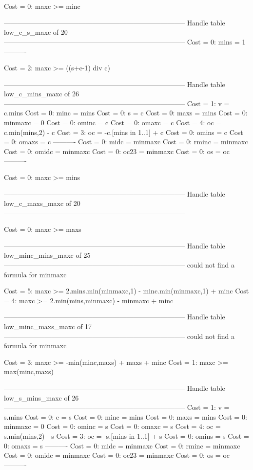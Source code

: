 Cost =  0:  maxc >= minc

--------------------------------------------------------------------------------
Handle table low_c_s_maxc of 20
--------------------------------------------------------------------------------
Cost =  0:  mins = 1
----------

Cost =  2:  maxc >= ((s+c-1) div c)

--------------------------------------------------------------------------------
Handle table low_c_mins_maxc of 26
--------------------------------------------------------------------------------
Cost =  1:  v       = c.mins
Cost =  0:  minc    = mins
Cost =  0:  s       = c
Cost =  0:  maxs    = mins
Cost =  0:  minmaxc = 0
Cost =  0:  ominc   = c
Cost =  0:  omaxc   = c
Cost =  4:  oc      = c.min(mins,2) - c
Cost =  3:  oc      = -c.[mins in 1..1] + c
Cost =  0:  omins   = c
Cost =  0:  omaxs   = c
----------
Cost =  0:  midc    = minmaxc
Cost =  0:  rminc   = minmaxc
Cost =  0:  omidc   = minmaxc
Cost =  0:  oc23    = minmaxc
Cost =  0:  os      = oc
----------

Cost =  0:  maxc >= mins

--------------------------------------------------------------------------------
Handle table low_c_maxs_maxc of 20
--------------------------------------------------------------------------------

Cost =  0:  maxc >= maxs

--------------------------------------------------------------------------------
Handle table low_minc_mins_maxc of 25
--------------------------------------------------------------------------------
could not find a formula for minmaxc

Cost =  5:  maxc >= 2.mins.min(minmaxc,1) - minc.min(minmaxc,1) + minc
Cost =  4:  maxc >= 2.min(mins,minmaxc) - minmaxc + minc

--------------------------------------------------------------------------------
Handle table low_minc_maxs_maxc of 17
--------------------------------------------------------------------------------
could not find a formula for minmaxc

Cost =  3:  maxc >= -min(minc,maxs) + maxs + minc
Cost =  1:  maxc >= max(minc,maxs)

--------------------------------------------------------------------------------
Handle table low_s_mins_maxc of 26
--------------------------------------------------------------------------------
Cost =  1:  v       = s.mins
Cost =  0:  c       = s
Cost =  0:  minc    = mins
Cost =  0:  maxs    = mins
Cost =  0:  minmaxc = 0
Cost =  0:  ominc   = s
Cost =  0:  omaxc   = s
Cost =  4:  oc      = s.min(mins,2) - s
Cost =  3:  oc      = -s.[mins in 1..1] + s
Cost =  0:  omins   = s
Cost =  0:  omaxs   = s
----------
Cost =  0:  midc    = minmaxc
Cost =  0:  rminc   = minmaxc
Cost =  0:  omidc   = minmaxc
Cost =  0:  oc23    = minmaxc
Cost =  0:  os      = oc
----------

